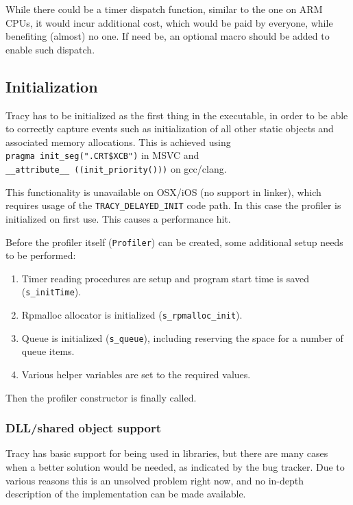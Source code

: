 \documentclass[hidelinks,titlepage,a4paper]{article}
\begin{document}
While there could be a timer dispatch function, similar to the one on ARM CPUs, it would incur additional cost, which would be paid by everyone, while benefiting (almost) no one. If need be, an optional macro should be added to enable such dispatch.

\subsection{Initialization}

Tracy has to be initialized as the first thing in the executable, in order to be able to correctly capture events such as initialization of all other static objects and associated memory allocations. This is achieved using \texttt{pragma~init\_seg(".CRT\$XCB")} in MSVC and \texttt{\_\_attribute\_\_~((init\_priority()))} on gcc/clang.

This functionality is unavailable on OSX/iOS (no support in linker), which requires usage of the \texttt{TRACY\_DELAYED\_INIT} code path. In this case the profiler is initialized on first use. This causes a performance hit.

Before the profiler itself (\texttt{Profiler}) can be created, some additional setup needs to be performed:

\begin{enumerate}
\item Timer reading procedures are setup and program start time is saved (\texttt{s\_initTime}).
\item Rpmalloc allocator is initialized (\texttt{s\_rpmalloc\_init}).
\item Queue is initialized (\texttt{s\_queue}), including reserving the space for a number of queue items.
\item Various helper variables are set to the required values.
\end{enumerate}

Then the profiler constructor is finally called.

\subsubsection{DLL/shared object support}

Tracy has basic support for being used in libraries, but there are many cases when a better solution would be needed, as indicated by the bug tracker. Due to various reasons this is an unsolved problem right now, and no in-depth description of the implementation can be made available.
\end{document}
